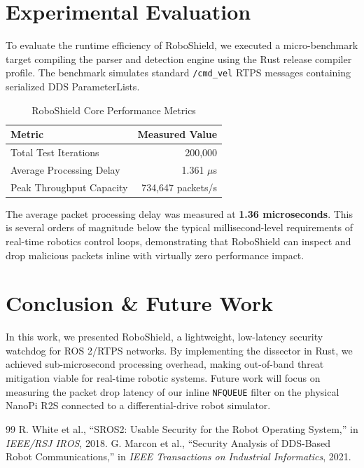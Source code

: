 \documentclass[letterpaper, 10 pt, conference]{ieeeconf}
\begin{document}
\section{Experimental Evaluation}
To evaluate the runtime efficiency of RoboShield, we executed a micro-benchmark target compiling the parser and detection engine using the Rust release compiler profile. The benchmark simulates standard \texttt{/cmd\_vel} RTPS messages containing serialized DDS ParameterLists.

\begin{table}[htbp]
\caption{RoboShield Core Performance Metrics}
\label{tab:performance}
\begin{center}
\begin{tabular}{lr}
\toprule
\textbf{Metric} & \textbf{Measured Value} \\
\midrule
Total Test Iterations & 200,000 \\
Average Processing Delay & 1.361 $\mu$s \\
Peak Throughput Capacity & 734,647 packets/s \\
\bottomrule
\end{tabular}
\end{center}
\end{table}

The average packet processing delay was measured at \textbf{1.36 microseconds}. This is several orders of magnitude below the typical millisecond-level requirements of real-time robotics control loops, demonstrating that RoboShield can inspect and drop malicious packets inline with virtually zero performance impact.

\section{Conclusion \& Future Work}
In this work, we presented RoboShield, a lightweight, low-latency security watchdog for ROS 2/RTPS networks. By implementing the dissector in Rust, we achieved sub-microsecond processing overhead, making out-of-band threat mitigation viable for real-time robotic systems. Future work will focus on measuring the packet drop latency of our inline \texttt{NFQUEUE} filter on the physical NanoPi R2S connected to a differential-drive robot simulator.

\begin{thebibliography}{99}
 R. White et al., ``SROS2: Usable Security for the Robot Operating System,'' in \emph{IEEE/RSJ IROS}, 2018.
 G. Marcon et al., ``Security Analysis of DDS-Based Robot Communications,'' in \emph{IEEE Transactions on Industrial Informatics}, 2021.
\end{thebibliography}
\end{document}
